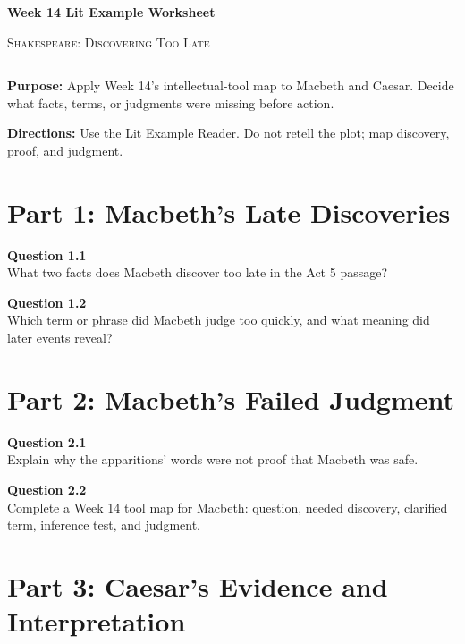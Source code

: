\documentclass[12pt]{article}
\begin{document}
\begin{center}
{\LARGE\bfseries Week 14 Lit Example Worksheet}\par\vspace{0.05em}
{\large\scshape Shakespeare: Discovering Too Late}\par\vspace{0.12em}
\rule{0.78\textwidth}{0.5pt}
\end{center}

\textbf{Purpose:} Apply Week 14's intellectual-tool map to Macbeth and Caesar. Decide what facts, terms, or judgments were missing before action.

\textbf{Directions:} Use the Lit Example Reader. Do not retell the plot; map discovery, proof, and judgment.

\section*{Part 1: Macbeth's Late Discoveries}

\textbf{Question 1.1}\\[-0.15em]
What two facts does Macbeth discover too late in the Act 5 passage?


\textbf{Question 1.2}\\[-0.15em]
Which term or phrase did Macbeth judge too quickly, and what meaning did later events reveal?


\newpage

\section*{Part 2: Macbeth's Failed Judgment}

\textbf{Question 2.1}\\[-0.15em]
Explain why the apparitions' words were not proof that Macbeth was safe.


\textbf{Question 2.2}\\[-0.15em]
Complete a Week 14 tool map for Macbeth: question, needed discovery, clarified term, inference test, and judgment.


\newpage

\section*{Part 3: Caesar's Evidence and Interpretation}
\end{document}
